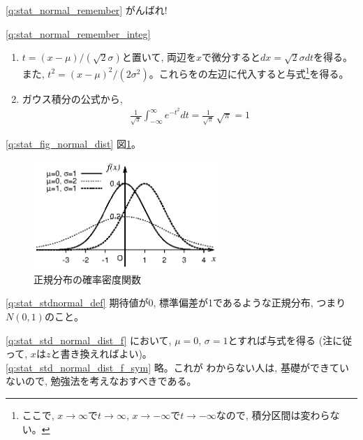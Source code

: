 \ref{q:stat_normal_remember}  がんばれ!
\mv

\ref{q:stat_normal_remember_integ}
\begin{enumerate}
\item $t=(x- \mu)/(\sqrt2 \sigma)$と置いて, 両辺を$x$で微分すると$dx = \sqrt2 \sigma dt$を得る。また, $t^2=(x- \mu)^2/(2\sigma^2)$。これらをの左辺に代入すると与式\footnote{ここで, $x \rightarrow \infty$で$t \rightarrow \infty$, $x \rightarrow -\infty$で$t \rightarrow -\infty$なので, 積分区間は変わらない。}を得る。
\item ガウス積分の公式から, 
\begin{eqnarray*}
\frac{1}{\sqrt{\pi}} \int_{-\infty}^{\infty}e^{-t^2}dt
= \frac{1}{\sqrt{\pi}}\,\sqrt{\pi} = 1
\end{eqnarray*}
\end{enumerate}
\mv


\ref{q:stat_fig_normal_dist}  図\ref{fig:normal_dist3}。
\begin{figure}[h]
    \centering
    \includegraphics[width=7cm]{normal_dist3.eps}
    \caption{正規分布の確率密度関数\label{fig:normal_dist3}}
\end{figure}
\mv

\ref{q:stat_stdnormal_def} 期待値が0, 
標準偏差が1であるような正規分布, つまり$N(0, 1)$のこと。
\mv

\ref{q:stat_std_normal_dist_f}
において, $\mu=0$, $\sigma=1$とすれば与式を得る
(注に従って, $x$は$z$と書き換えればよい)。\\

\ref{q:stat_std_normal_dist_f_sym} 略。これが
わからない人は, 基礎ができていないので, 勉強法を考えなおすべきである。\\

